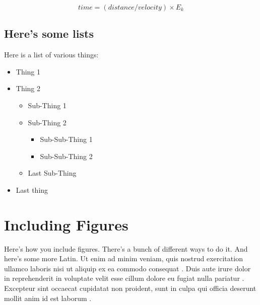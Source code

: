 \documentclass[journal,onecolumn]{IEEEtran}
\begin{document}
\begin{equation*}
time = (distance / velocity) \times  E_{k}
\end{equation*}

\subsection{Here's some lists}

Here is a list of various things:
\begin{itemize}
	\item{Thing 1}
	\item{Thing 2}
		\begin{itemize}
			\item{Sub-Thing 1}
			\item{Sub-Thing 2}
			\begin{itemize}
				\item{Sub-Sub-Thing 1}
				\item{Sub-Sub-Thing 2}
			\end{itemize}
			\item{Last Sub-Thing}
		\end{itemize}
	\item{Last thing}
\end{itemize}

\section{Including Figures}

Here's how you include figures. There's a bunch of different ways to do it. And here's some more Latin.
Ut enim ad minim veniam, quis nostrud exercitation ullamco laboris nisi ut aliquip ex ea commodo consequat \cite{kanto:kanto}. Duis aute irure dolor in reprehenderit in voluptate velit esse cillum dolore eu fugiat nulla pariatur \cite{monge:monge}. Excepteur sint occaecat cupidatat non proident, sunt in culpa qui officia deserunt mollit anim id est laborum \cite{web:web}.
\end{document}
